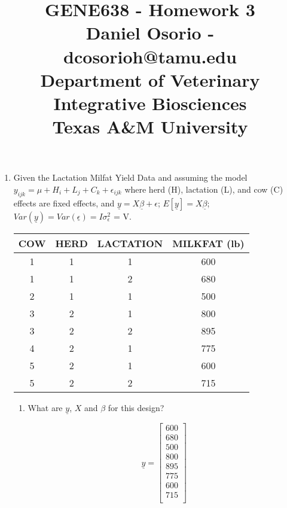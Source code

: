 \documentclass[12pt,a4paper]{paper}
\begin{document}
\title{GENE638 - Homework 3\\\small{Daniel Osorio - dcosorioh@tamu.edu\\Department of Veterinary Integrative Biosciences\\Texas A\&M University}}
\maketitle

\begin{enumerate}
\item Given the Lactation Milfat Yield Data and assuming the model $y_{ijk} = \mu + H_{i} + L_{j}+C_{k} + \epsilon_{ijk}$ where herd (H), lactation (L), and cow (C) effects are fixed effects, and $\underline{y} = X\underline{\beta} + \epsilon$; $E\left[\underline{y}\right] = X\underline{\beta}$; $Var(\underline{y}) = Var(\underline{\epsilon}) = I\sigma^{2}_{\epsilon}$ = V.
\begin{center}
\begin{tabular}{|c|c|c|c|}
\hline
COW & HERD & LACTATION & MILKFAT (lb) \\
\hline
\hline
1 & 1 & 1 & 600 \\
\hline
1 & 1 & 2 & 680 \\
\hline
2 & 1 & 1 & 500 \\
\hline
3 & 2 & 1 & 800 \\
\hline
3 & 2 & 2 & 895 \\
\hline
4 & 2 & 1 & 775 \\
\hline
5 & 2 & 1 & 600 \\
\hline
5 & 2 & 2 & 715 \\
\hline
\end{tabular}
\end{center}
\begin{enumerate}
\item What are $\underline{y}$, $X$ and $\beta$ for this design?\\
\begin{minipage}[c]{0.2\linewidth}
\[\underline{y} = \left[\begin{array}{c}
  600 \\ 
  680 \\ 
  500 \\ 
  800 \\ 
  895 \\ 
  775 \\ 
  600 \\ 
  715 \\ \end{array}\right]\]

\end{minipage}
\end{enumerate}
\end{enumerate}
\end{document}

